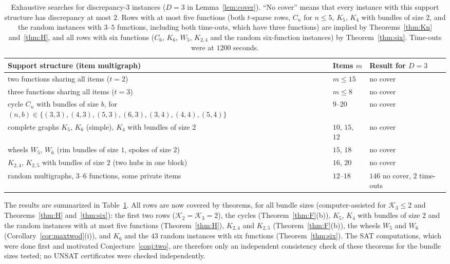 \documentclass[11pt,letterpaper]{article}
\theoremstyle{definition}
\begin{document}
\begin{table}[t]
\centering
\small
\begin{tabular}{@{}p{8.6cm}ll@{}}
\toprule
Support structure (item multigraph) & Items $m$ & Result for $D=3$\\
\midrule
two functions sharing all items ($t=2$) & $m\le15$ & no cover\\
three functions sharing all items ($t=3$) & $m\le8$ & no cover\\
cycle $C_n$ with bundles of size $b$, for $(n,b)\in\{(3,3),(4,3),(5,3),(6,3),(3,4),(4,4),(5,4)\}$ & $9$--$20$ & no cover\\
complete graphs $K_5$, $K_6$ (simple), $K_4$ with bundles of size $2$ & $10$, $15$, $12$ & no cover\\
wheels $W_5$, $W_6$ (rim bundles of size $1$, spokes of size $2$) & $15$, $18$ & no cover\\
$K_{2,4}$, $K_{2,5}$ with bundles of size $2$ (two hubs in one block) & $16$, $20$ & no cover\\
random multigraphs, $3$--$6$ functions, some private items & $12$--$18$ & $146$ no cover, $2$ time-outs\\
\bottomrule
\end{tabular}
\caption{Exhaustive searches for discrepancy-$3$ instances ($D=3$ in Lemma~\ref{lem:cover}). ``No
cover'' means that every instance with this support structure has discrepancy at most $2$. Rows
with at most five functions (both $t$-sparse rows, $C_n$ for $n\le5$, $K_5$, $K_4$ with bundles of
size $2$, and the random instances with $3$--$5$ functions, including both time-outs, which have
three functions) are implied by Theorems~\ref{thm:Kn} and~\ref{thm:H}, and all rows with six functions
($C_6$, $K_6$, $W_5$, $K_{2,4}$ and the random six-function instances) by Theorem~\ref{thm:six}. Time-outs were at $1200$
seconds.}
\label{tab:sat}
\end{table}

The results are summarized in Table~\ref{tab:sat}. All rows are now covered by theorems, for all bundle
sizes (computer-assisted for $\mathcal{K}_3\le2$ and Theorems~\ref{thm:H} and~\ref{thm:six}):
the first two rows ($\mathcal{K}_2=\mathcal{K}_3=2$), the cycles (Theorem~\ref{thm:F}(b)), $K_5$, $K_4$ with
bundles of size $2$ and the random instances with at most five functions (Theorem~\ref{thm:H}),
$K_{2,4}$ and $K_{2,5}$ (Theorem~\ref{thm:F}(b)), the wheels $W_5$ and $W_6$
(Corollary~\ref{cor:maxtwod}(i)), and $K_6$ and the $43$ random instances with six functions
(Theorem~\ref{thm:six}). The SAT computations, which were done first and motivated
Conjecture~\ref{conj:two}, are therefore only an independent consistency check of these theorems for
the bundle sizes tested; no UNSAT certificates were checked independently.
\end{document}
